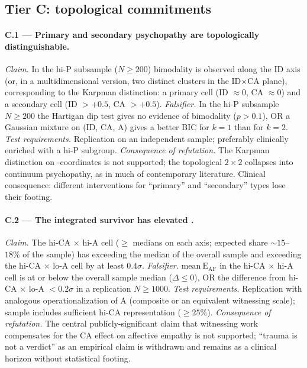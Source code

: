 \subsection{Tier C: topological commitments}
\label{subsec:falsification_tier_c}

\paragraph{C.1 --- Primary and secondary psychopathy are topologically distinguishable.}
\emph{Claim.} In the hi-P subsample ($N \geq 200$) bimodality is observed along the ID axis (or, in a multidimensional version, two distinct clusters in the ID$\times$CA plane), corresponding to the Karpman distinction: a primary cell (ID $\approx 0$, CA $\approx 0$) and a secondary cell (ID $> +0.5$, CA $> +0.5$).
\emph{Falsifier.} In the hi-P subsample $N \geq 200$ the Hartigan dip test gives no evidence of bimodality ($p > 0.1$), OR a Gaussian mixture on (ID, CA, A) gives a better BIC for $k=1$ than for $k=2$.
\emph{Test requirements.} Replication on an independent sample; preferably clinically enriched with a hi-P subgroup.
\emph{Consequence of refutation.} The Karpman distinction on \DEIC{}-coordinates is not supported; the topological $2\times2$ collapses into continuum psychopathy, as in much of contemporary literature. Clinical consequence: different interventions for ``primary'' and ``secondary'' types lose their footing.

\paragraph{C.2 --- The integrated survivor has elevated \EAF{}.}
\emph{Claim.} The hi-CA $\times$ hi-A cell ($\geq$ medians on each axis; expected share $\sim 15$--$18\%$ of the sample) has \EAF{} exceeding the median of the overall sample and exceeding the hi-CA $\times$ lo-A cell by at least $0.4\sigma$.
\emph{Falsifier.} $\mathrm{mean}\ \mathrm{E_{AF}}$ in the hi-CA $\times$ hi-A cell is at or below the overall sample median ($\Delta \leq 0$), OR the difference from hi-CA $\times$ lo-A $< 0.2\sigma$ in a replication $N \geq 1000$.
\emph{Test requirements.} Replication with analogous operationalization of A (composite or an equivalent witnessing scale); sample includes sufficient hi-CA representation ($\geq 25\%$).
\emph{Consequence of refutation.} The central publicly-significant claim that witnessing work compensates for the CA effect on affective empathy is not supported; ``trauma is not a verdict'' as an empirical claim is withdrawn and remains as a clinical horizon without statistical footing.


